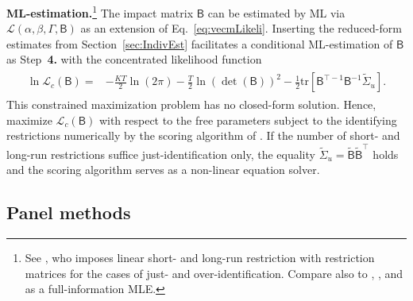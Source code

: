 \textbf{ML-estimation.}\footnote{See \citet{Vlaar2004}, who imposes linear short- and long-run restriction with restriction matrices for the cases of just- and over-identification. Compare also to \citet[Ch.~11, p.~331]{Hamilton1994}, \citet[Ch.~3.2, p.~84]{Lutkepohl2006}, and \citet[Ch.~11.2.2 and p.~315]{KilianLutkepohl2017} as a full-information MLE.} The impact matrix $ \mathsf{B} $ can be estimated by ML via $ \mathcal{L} \left(\alpha, \beta, \Gamma, \mathsf{B} \right) $ as an extension of Eq.~\eqref{eq:vecmLikeli}. Inserting the reduced-form estimates from Section~\ref{sec:IndivEst} facilitates a conditional ML-estimation of $ \mathsf{B} $ as Step~\textbf{4.} with the concentrated likelihood function
\begin{align} \label{eq:svecmLikeli}
\begin{split}
	\ln \mathcal{L}_c \left( \mathsf{B} \right) = & - \frac{KT}{2} \ln \left( 2\pi \right) - \frac{T}{2} \ln \left( \det ( \mathsf{B} ) \right)^2 - \frac{1}{2} \text{tr} \left[ \mathsf{B}^{\top -1} \mathsf{B}^{-1} \widetilde{\Sigma}_u \right].
\end{split}
\end{align}
This constrained maximization problem has no closed-form solution. Hence, \cite{BreitungEtAl2004} maximize $ \mathcal{L}_c \left( \mathsf{B} \right) $ with respect to the free parameters subject to the identifying restrictions numerically by the scoring algorithm of \citet{AmisanoGiannini1997}. If the number of short- and long-run restrictions suffice just-identification only, the equality $ \widetilde{\Sigma}_u = \mathsf{\widetilde{B}} \mathsf{\widetilde{B}}^\top $ holds and the scoring algorithm serves as a non-linear equation solver.


\subsection{Panel methods} \label{sec:Panel}

